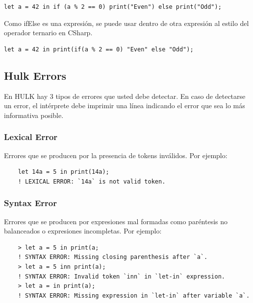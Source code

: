 \documentclass[a4paper, 12pt]{report}
\begin{document}
\begin{lstlisting}
let a = 42 in if (a % 2 == 0) print("Even") else print("Odd");
\end{lstlisting}

Como ifElse es una expresión, se puede usar dentro de otra expresión al estilo del operador ternario en CSharp.

\begin{lstlisting}
let a = 42 in print(if(a % 2 == 0) "Even" else "Odd");
\end{lstlisting}


\subsection*{Hulk Errors}

En HULK hay 3 tipos de errores que usted debe detectar. En caso de detectarse un error, el intérprete debe imprimir una línea indicando el error que sea lo más informativa posible.

\subsubsection*{Lexical Error}

Errores que se producen por la presencia de tokens inválidos. Por ejemplo:

\begin{lstlisting}
    let 14a = 5 in print(14a); 
    ! LEXICAL ERROR: `14a` is not valid token.
\end{lstlisting}

\subsubsection*{Syntax Error}

Errores que se producen por expresiones mal formadas como paréntesis no balanceados o expresiones incompletas. Por ejemplo:

\begin{lstlisting}
    > let a = 5 in print(a;
    ! SYNTAX ERROR: Missing closing parenthesis after `a`.
    > let a = 5 inn print(a);
    ! SYNTAX ERROR: Invalid token `inn` in `let-in` expression.
    > let a = in print(a);
    ! SYNTAX ERROR: Missing expression in `let-in` after variable `a`.
\end{lstlisting}
\end{document}
